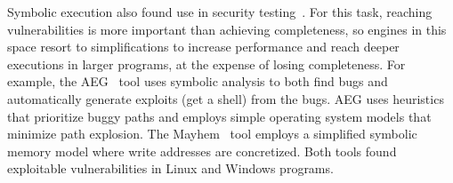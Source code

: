 Symbolic execution also found use in security testing~\cite{aeg,mayhem,bitBlaze}.  For this task, reaching vulnerabilities is more important than achieving completeness, so engines in this space resort to simplifications to increase performance and reach deeper executions in larger programs, at the expense of losing completeness.
%
For example, the AEG~\cite{aeg} tool uses symbolic analysis to both find bugs and automatically generate exploits (get a shell) from the bugs.  AEG uses heuristics that prioritize buggy paths and employs simple operating system models that minimize path explosion.
%
The Mayhem~\cite{mayhem} tool employs a simplified symbolic memory model where write addresses are concretized.
%
Both tools found exploitable vulnerabilities in Linux and Windows programs.



